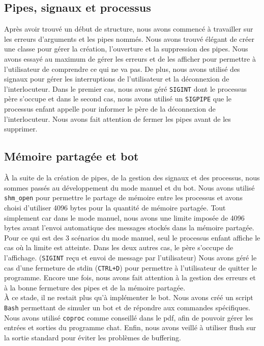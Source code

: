 \documentclass{article}
\begin{document}
\subsection{Pipes, signaux et processus}
\label{pipes-signaux-et-processus}


Après avoir trouvé un début de structure, nous avons commencé à travailler sur les erreurs d'arguments et les pipes nommés. 
Nous avons trouvé élégant de créer une classe pour gérer la création, l'ouverture et la suppression des pipes.
Nous avons essayé au maximum de gérer les erreurs et de les afficher pour permettre à l'utilisateur de comprendre ce qui ne va pas.
De plus, nous avons utilisé des signaux pour gérer les interruptions de l'utilisateur et la déconnexion de l'interlocuteur.
Dans le premier cas, nous avons géré \texttt{SIGINT} dont le processus père s'occupe et dans le second cas, nous avons utilisé un \texttt{SIGPIPE} 
que le processus enfant appelle pour informer le père de la déconnexion de l'interlocuteur. 
Nous avons fait attention de fermer les pipes avant de les supprimer.

\newpage

\subsection{Mémoire partagée et bot}
\label{memoire-partagee-et-bot}


À la suite de la création de pipes, de la gestion des signaux et des processus, nous sommes passés au développement du mode manuel et du bot.
Nous avons utilisé \texttt{shm\_open} pour permettre le partage de mémoire entre les processus et avons choisi d'utiliser 4096 bytes pour la quantité de mémoire partagée.
Tout simplement car dans le mode manuel, nous avons une limite imposée de 4096 bytes avant l'envoi automatique des messages stockés dans la mémoire partagée.
Pour ce qui est des 3 scénarios du mode manuel, seul le processus enfant affiche le cas où la limite est atteinte.
Dans les deux autres cas, le père s'occupe de l'affichage. (\texttt{SIGINT} reçu et envoi de message par l'utilisateur)
Nous avons géré le cas d'une fermeture de stdin (\texttt{CTRL+D}) pour permettre à l'utilisateur de quitter le programme.
Encore une fois, nous avons fait attention à la gestion des erreurs et à la bonne fermeture des pipes et de la mémoire partagée.\\

À ce stade, il ne restait plus qu'à implémenter le bot. Nous avons créé un script \texttt{Bash} permettant de simuler un bot et de répondre aux commandes spécifiques.
Nous avons utilisé \texttt{coproc} comme conseillé dans le pdf, afin de pouvoir gérer les entrées et sorties du programme chat.
Enfin, nous avons veillé à utiliser flush sur la sortie standard pour éviter les problèmes de buffering.
\end{document}
